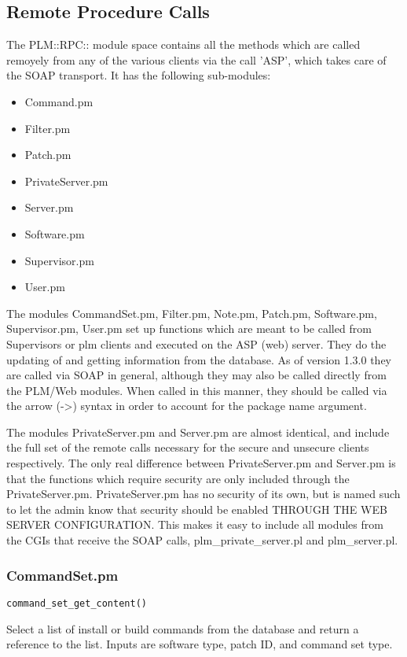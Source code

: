 \subsection{Remote Procedure Calls}
The PLM::RPC:: module space contains all the methods which are called remoyely from any of the various clients via the call 'ASP', which takes care of the SOAP transport.  It has the following sub-modules:


\begin{itemize}
\item Command.pm
\item Filter.pm
\item Patch.pm
\item PrivateServer.pm
\item Server.pm
\item Software.pm
\item Supervisor.pm
\item User.pm
\end{itemize}

The modules CommandSet.pm, Filter.pm, Note.pm, Patch.pm, Software.pm, Supervisor.pm, User.pm set up functions which are meant to be called from Supervisors or plm clients and executed on the ASP (web) server.  They do the updating of and getting information from the database.  As of version 1.3.0 they are called via SOAP in general, although they may also be called directly from the PLM/Web modules.  When called in this manner, they should be called via the arrow (->) syntax in order to account for the package name argument.

The modules PrivateServer.pm and Server.pm are almost identical, and include the full set of the remote calls necessary for the secure and unsecure clients respectively.  The only real difference between PrivateServer.pm and Server.pm is that the functions which require security are only included through the PrivateServer.pm.  PrivateServer.pm has no security of its own, but is named such to let the admin know that security should be enabled THROUGH THE WEB SERVER CONFIGURATION.  This makes it easy to include all modules from the CGIs that receive the SOAP calls, plm\_private\_server.pl and plm\_server.pl.

\subsubsection{CommandSet.pm}

\begin{verbatim}
command_set_get_content()
\end{verbatim}
Select a list of install or build commands from the database and return a reference to the list.  Inputs are software type, patch ID, and command set type.

